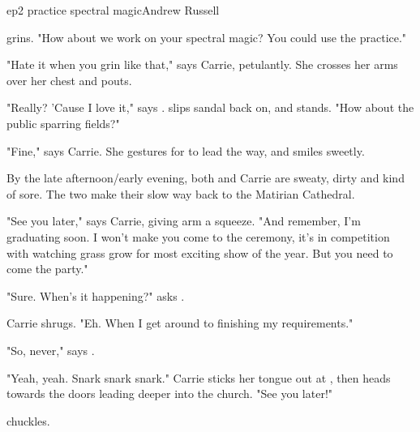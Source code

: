 \documentclass{book}
\begin{document}
\begin{childnode}{ep2 practice spectral magic}{Andrew Russell}

    \name{} grins. "How about we work on your spectral magic? You could use the practice."

    "Hate it when you grin like that," says Carrie, petulantly. She crosses her arms over her chest and pouts.

    "Really? 'Cause I love it," says \name{}. \HeShe{} slips \hisher{} sandal back on, and stands. "How about the public sparring fields?"

    "Fine," says Carrie. She gestures for \name{} to lead the way, and smiles sweetly.

    By the late afternoon/early evening, both \name{} and Carrie are sweaty, dirty and kind of sore. The two make their slow way back to the Matirian Cathedral.

    "See you later," says Carrie, giving \names{} arm a squeeze. "And remember, I'm graduating soon. I won't make you come to the ceremony, it's in competition with watching grass grow for
    most exciting show of the year. But you need to come the party."

    "Sure. When's it happening?" asks \name{}.

    Carrie shrugs. "Eh. When I get around to finishing my requirements."

    "So, never," says \name{}.

    "Yeah, yeah. Snark snark snark." Carrie sticks her tongue out at \name{}, then heads towards the doors leading deeper into the church. "See you later!"

    \name{} chuckles. 

\end{childnode}
\end{document}
